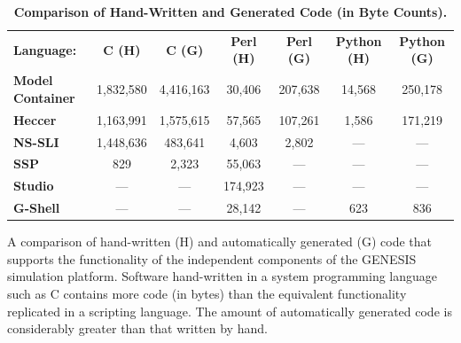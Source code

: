 \documentclass[10pt]{article}
\begin{document}
\clearpage


\begin{table}[ht]
\caption{
\bf{Comparison of Hand-Written and Generated Code (in Byte Counts).}}
\begin{tabular}{l c c c c c c}

    {\bf Language:}
    & {\bf C (H)}
    & {\bf C (G)}
    & {\bf Perl (H)}
    & {\bf Perl (G)}
    & {\bf Python (H)}
    & {\bf Python (G)} \\

    {\bf Model\,Container}
    & 1,832,580
    & 4,416,163
    & 30,406
    & 207,638
    & 14,568
    & 250,178 \\

    {\bf Heccer}
    & 1,163,991
    & 1,575,615
    & 57,565
    & 107,261
    & 1,586
    & 171,219 \\

    {\bf NS-SLI}
    & 1,448,636
    & 483,641
    & 4,603
    & 2,802
    & ---
    & --- \\

    {\bf SSP}
    & 829
    & 2,323
    & 55,063
    & ---
    & ---
    & --- \\

    {\bf Studio}
    & ---
    & ---
    & 174,923
    & ---
    & ---
    & --- \\

    {\bf G-Shell}
    & ---
    & ---
    & 28,142
    & ---
    & 623
    & 836 \\
\end{tabular}
\begin{flushleft} A comparison of hand-written (H) and automatically generated (G) code that supports the functionality of the independent components of the GENESIS simulation platform. Software hand-written in a system programming language such as C contains more code (in bytes) than the equivalent functionality replicated in a scripting language. The amount of automatically generated code is considerably greater than that written by hand.
\end{flushleft}
\label{tab:cbi-codecounts}
\end{table}

\clearpage

\end{document}
